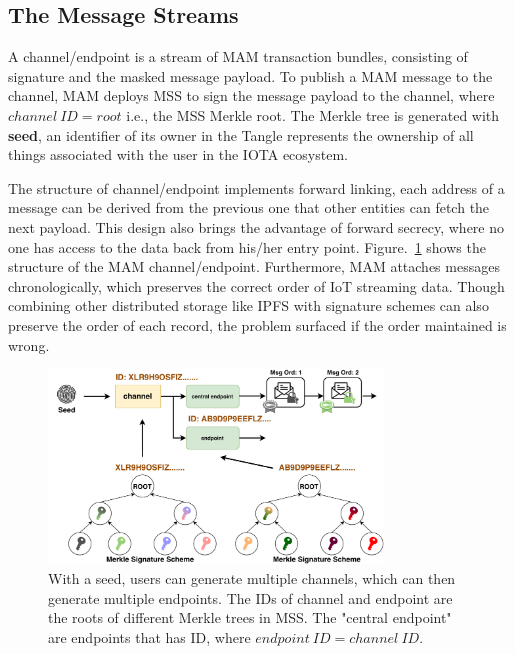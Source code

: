 \documentclass[10pt, conference, compsocconf]{IEEEtran}
\begin{document}
\subsection{The Message Streams}
\label{section:mam_streams}
A channel/endpoint is a stream of MAM transaction bundles, consisting of signature and the masked message payload. To publish a MAM message to the channel, MAM deploys MSS to sign the message payload to the channel, where $channel\ ID = root$ i.e., the MSS Merkle root. The Merkle tree is generated with \textbf{seed}, an identifier of its owner in the Tangle represents the ownership of all things associated with the user in the IOTA ecosystem.

The structure of channel/endpoint implements forward linking, each address of a message can be derived from the previous one that other entities can fetch the next payload. This design also brings the advantage of forward secrecy, where no one has access to the data back from his/her entry point. Figure.~\ref{fig:mam_structure} shows the structure of the MAM channel/endpoint. Furthermore, MAM attaches messages chronologically, which preserves the correct order of IoT streaming data. Though combining other distributed storage like IPFS\cite{IPFS} with signature schemes can also preserve the order of each record, the problem surfaced if the order maintained is wrong.

\begin{figure}[h]
    \centering
    \includegraphics[width=3.5in]{mam_structure}
    \caption{With a seed, users can generate multiple channels, which can then generate multiple endpoints. The IDs of channel and endpoint are the roots of different Merkle trees in MSS. The "central endpoint" are endpoints that has ID, where $endpoint\ ID = channel\ ID$.}
    \label{fig:mam_structure}
\end{figure}
\end{document}
